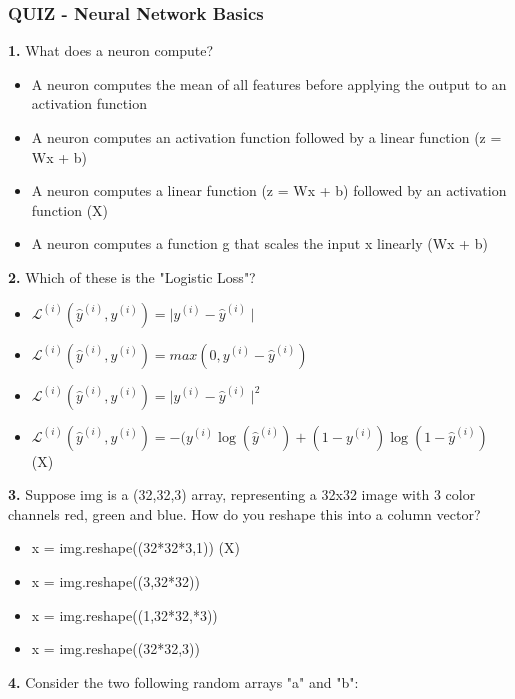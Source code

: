 \subsubsection*{QUIZ - Neural Network Basics}
\textbf{1.} What does a neuron compute?
\begin{itemize}
    \item A neuron computes the mean of all features before applying the output to an activation function
    \item A neuron computes an activation function followed by a linear function (z = Wx + b)
    \item A neuron computes a linear function (z = Wx + b) followed by an activation function (X)
    \item A neuron computes a function g that scales the input x linearly (Wx + b)
\end{itemize}
\textbf{2.} Which of these is the "Logistic Loss"?
\begin{itemize}
    \item $\mathcal{L}^{(i)}(\hat{y}^{(i)}, y^{(i)}) = \mid y^{(i)} - \hat{y}^{(i)} \mid$
    \item $\mathcal{L}^{(i)}(\hat{y}^{(i)}, y^{(i)}) = max(0, y^{(i)} - \hat{y}^{(i)})$
    \item $\mathcal{L}^{(i)}(\hat{y}^{(i)}, y^{(i)}) = \mid y^{(i)} - \hat{y}^{(i)} \mid^{2}$
    \item $\mathcal{L}^{(i)}(\hat{y}^{(i)}, y^{(i)}) = -( y^{(i)}\log(\hat{y}^{(i)}) + (1- y^{(i)})\log(1-\hat{y}^{(i)})$ (X)
\end{itemize}
\textbf{3.} Suppose img is a (32,32,3) array, representing a 32x32 image with 3 color channels red, green and blue. How do you reshape this into a column vector?
\begin{itemize}
    \item x = img.reshape((32*32*3,1)) (X)
    \item x = img.reshape((3,32*32))
    \item x = img.reshape((1,32*32,*3))
    \item x = img.reshape((32*32,3))
\end{itemize}
\textbf{4.} Consider the two following random arrays "a" and "b":

